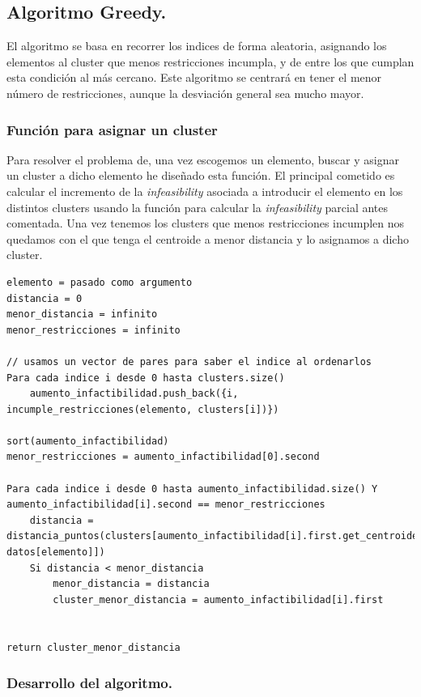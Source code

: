 \documentclass[12pt, spanish]{article}
\begin{document}
\subsection{Algoritmo Greedy.}

El algoritmo se basa en recorrer los indices de forma aleatoria, asignando los elementos al cluster que menos restricciones incumpla, y de entre los que cumplan esta condición al más cercano. Este algoritmo se centrará en tener el menor número de restricciones, aunque la desviación general sea mucho mayor.

\subsubsection{Función para asignar un cluster}

Para resolver el problema de, una vez escogemos un elemento, buscar y asignar un cluster a dicho elemento he diseñado esta función. El principal cometido es calcular el incremento de la \textit{infeasibility} asociada a introducir el elemento en los distintos clusters usando la función para calcular la \textit{infeasibility} parcial antes comentada. Una vez tenemos los clusters que menos restricciones incumplen nos quedamos con el que tenga el centroide a menor distancia y lo asignamos a dicho cluster.


\begin{lstlisting}
elemento = pasado como argumento
distancia = 0
menor_distancia = infinito
menor_restricciones = infinito

// usamos un vector de pares para saber el indice al ordenarlos
Para cada indice i desde 0 hasta clusters.size()
	aumento_infactibilidad.push_back({i, incumple_restricciones(elemento, clusters[i])})

sort(aumento_infactibilidad)
menor_restricciones = aumento_infactibilidad[0].second

Para cada indice i desde 0 hasta aumento_infactibilidad.size() Y aumento_infactibilidad[i].second == menor_restricciones
	distancia = distancia_puntos(clusters[aumento_infactibilidad[i].first.get_centroide(), datos[elemento]])
	Si distancia < menor_distancia
		menor_distancia = distancia
		cluster_menor_distancia = aumento_infactibilidad[i].first


return cluster_menor_distancia
\end{lstlisting}


\subsubsection{Desarrollo del algoritmo.}
\end{document}
